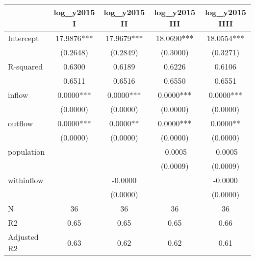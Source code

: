 \begin{table}
\caption{}
\begin{center}
\begin{tabular}{lcccc}
\hline
            & log\_y2015 I & log\_y2015 II & log\_y2015 III & log\_y2015 IIII  \\
\midrule
Intercept   & 17.9876***   & 17.9679***    & 18.0690***     & 18.0554***       \\
            & (0.2648)     & (0.2849)      & (0.3000)       & (0.3271)         \\
R-squared   & 0.6300       & 0.6189        & 0.6226         & 0.6106           \\
            & 0.6511       & 0.6516        & 0.6550         & 0.6551           \\
inflow      & 0.0000***    & 0.0000***     & 0.0000***      & 0.0000***        \\
            & (0.0000)     & (0.0000)      & (0.0000)       & (0.0000)         \\
outflow     & 0.0000***    & 0.0000**      & 0.0000***      & 0.0000**         \\
            & (0.0000)     & (0.0000)      & (0.0000)       & (0.0000)         \\
population  &              &               & -0.0005        & -0.0005          \\
            &              &               & (0.0009)       & (0.0009)         \\
withinflow  &              & -0.0000       &                & -0.0000          \\
            &              & (0.0000)      &                & (0.0000)         \\
N           & 36           & 36            & 36             & 36               \\
R2          & 0.65         & 0.65          & 0.65           & 0.66             \\
Adjusted R2 & 0.63         & 0.62          & 0.62           & 0.61             \\
\hline
\end{tabular}
\end{center}
\end{table}